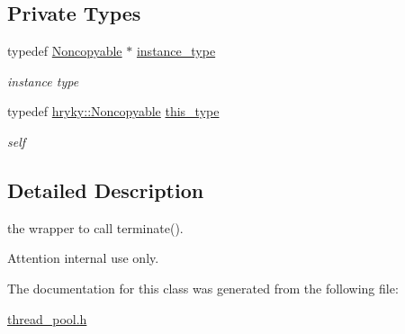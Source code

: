 \subsection*{Private Types}
\begin{DoxyCompactItemize}
\item 
\hypertarget{classhryky_1_1_noncopyable_aaf87abb55f700af85ecb0895f6178821}{typedef \hyperlink{classhryky_1_1_noncopyable}{Noncopyable} $\ast$ \hyperlink{classhryky_1_1_noncopyable_aaf87abb55f700af85ecb0895f6178821}{instance\-\_\-type}}\label{classhryky_1_1_noncopyable_aaf87abb55f700af85ecb0895f6178821}

\begin{DoxyCompactList}\small\item\em instance type \end{DoxyCompactList}\item 
\hypertarget{classhryky_1_1_noncopyable_acf13ad1c98a76247a561dff514979da5}{typedef \hyperlink{classhryky_1_1_noncopyable}{hryky\-::\-Noncopyable} \hyperlink{classhryky_1_1_noncopyable_acf13ad1c98a76247a561dff514979da5}{this\-\_\-type}}\label{classhryky_1_1_noncopyable_acf13ad1c98a76247a561dff514979da5}

\begin{DoxyCompactList}\small\item\em self \end{DoxyCompactList}\end{DoxyCompactItemize}


\subsection{Detailed Description}
the wrapper to call terminate(). 

\begin{DoxyAttention}{Attention}
internal use only. 
\end{DoxyAttention}


The documentation for this class was generated from the following file\-:\begin{DoxyCompactItemize}
\item 
\hyperlink{thread__pool_8h}{thread\-\_\-pool.\-h}\end{DoxyCompactItemize}
